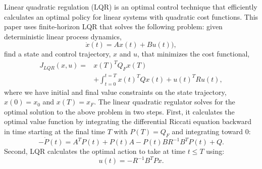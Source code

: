 Linear quadratic regulation (LQR) is an optimal control technique that
efficiently calculates an optimal policy for linear systems with
quadratic cost functions. This paper uses finite-horizon LQR that
solves the following problem: given deterministic linear process
dynamics,
\begin{equation}
\dot{x}(t) = Ax(t) + Bu(t)),
\label{eqn:linear_system}
\end{equation}
find a state and control trajectory, $x$ and $u$, that minimizes
the cost functional,
\begin{align} \nonumber
J_{LQR}(x,u) = & x(T)^T Q_F x(T) \\
& + \int_{t=0}^{t=T} x(t)^T Q x(t) + u(t)^T R u(t),
\label{eqn:lqr_cost}
\end{align}
where we have initial and final value constraints on the state
trajectory, $x(0) = x_0$ and $x(T) = x_F$. The linear quadratic
regulator solves for the optimal solution to the above problem in two
steps. First, it calculates the optimal value function by integrating
the differential Riccati equation backward in time starting at the
final time $T$ with $P(T) = Q_F$ and integrating toward $0$:
\[
-\dot{P}(t) = A^T P(t) + P(t) A - P(t) B R^{-1} B^T P(t) + Q.
\]
Second, LQR calculates the optimal action to take at time $t \leq T$
using:
\[
u(t) = -R^{-1} B^T P x.
\]

